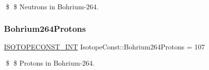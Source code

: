 \$ \$ Neutrons in Bohrium-\/264. \mbox{\label{group___isotope_const-_bohrium-_bh264_ga9d45eac1e88128430ca02c84cdc0e809}} 
\subsubsection{\texorpdfstring{Bohrium264\+Protons}{Bohrium264Protons}}
{\footnotesize\ttfamily \mbox{\hyperlink{group___isotope_const-_macros_ga5f18360b3e99483a35c32d789e62621c}{I\+S\+O\+T\+O\+P\+E\+C\+O\+N\+S\+T\+\_\+\+I\+NT}} Isotope\+Const\+::\+Bohrium264\+Protons = 107}

\$ \$ Protons in Bohrium-\/264. 